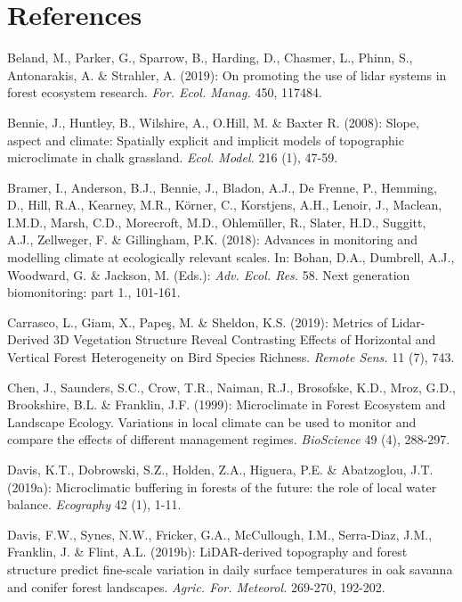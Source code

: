 \documentclass[5p]{elsarticle} %
\newlength{\cslhangindent}
\newlength{\cslentryspacingunit} %
\newenvironment{CSLReferences}[2] %
 {%
  \setlength{\parindent}{0pt}
  \ifodd #1
  \let\oldpar\par
  \def\par{\hangindent=\cslhangindent\oldpar}
  \fi
  \setlength{\parskip}{#2\cslentryspacingunit}
 }%
 {}
\begin{document}
\hypertarget{references}{%
\section*{References}\label{references}}

\hypertarget{refs}{}
\begin{CSLReferences}{1}{0}


Beland, M., Parker, G., Sparrow, B., Harding, D., Chasmer, L., Phinn, S., Antonarakis, A. \& Strahler, A. (2019): On promoting the use of lidar systems in forest ecosystem research. \emph{For. Ecol. Manag.} 450, 117484.

Bennie, J., Huntley, B., Wilshire, A., O.Hill, M. \& Baxter R. (2008): Slope, aspect and climate: Spatially explicit and implicit models of topographic microclimate in chalk grassland. \emph{Ecol. Model.} 216 (1), 47-59.

Bramer, I., Anderson, B.J., Bennie, J., Bladon, A.J., De Frenne, P., Hemming, D., Hill, R.A., Kearney, M.R., Körner, C., Korstjens, A.H., Lenoir, J., Maclean, I.M.D., Marsh, C.D., Morecroft, M.D., Ohlemüller, R., Slater, H.D., Suggitt, A.J., Zellweger, F. \& Gillingham, P.K. (2018): Advances in monitoring and modelling climate at ecologically relevant scales. In: Bohan, D.A., Dumbrell, A.J., Woodward, G. \& Jackson, M. (Eds.): \emph{Adv. Ecol. Res.} 58. Next generation biomonitoring: part 1., 101-161.

Carrasco, L., Giam, X., Papeş, M. \& Sheldon, K.S. (2019): Metrics of Lidar-Derived 3D Vegetation Structure Reveal Contrasting Effects of Horizontal and Vertical Forest Heterogeneity on Bird Species Richness. \emph{Remote Sens.} 11 (7), 743.

Chen, J., Saunders, S.C., Crow, T.R., Naiman, R.J., Brosofske, K.D., Mroz, G.D., Brookshire, B.L. \& Franklin, J.F. (1999): Microclimate in Forest Ecosystem and Landscape Ecology. Variations in local climate can be used to monitor and compare the effects of different management regimes. \emph{BioScience} 49 (4), 288-297.

Davis, K.T., Dobrowski, S.Z., Holden, Z.A., Higuera, P.E. \& Abatzoglou, J.T. (2019a): Microclimatic buffering in forests of the future: the role of local water balance. \emph{Ecography} 42 (1), 1-11.

Davis, F.W., Synes, N.W., Fricker, G.A., McCullough, I.M., Serra-Diaz, J.M., Franklin, J. \& Flint, A.L. (2019b): LiDAR-derived topography and forest structure predict fine-scale variation in daily surface temperatures in oak savanna and conifer forest landscapes. \emph{Agric. For. Meteorol.} 269-270, 192-202.


\end{CSLReferences}
\end{document}
